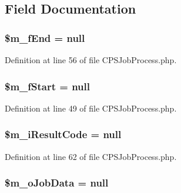 \subsection{Field Documentation}
\hypertarget{classCPSJobProcess_a98cd8e9f9042e529e7018d1c2ad9d15b}{
\subsubsection[{\$m\_\-fEnd}]{\setlength{\rightskip}{0pt plus 5cm}\$m\_\-fEnd = null}}
\label{classCPSJobProcess_a98cd8e9f9042e529e7018d1c2ad9d15b}


Definition at line 56 of file CPSJobProcess.php.

\hypertarget{classCPSJobProcess_a63a0fe0120a9bdc4e87f600d2964a2a6}{
\subsubsection[{\$m\_\-fStart}]{\setlength{\rightskip}{0pt plus 5cm}\$m\_\-fStart = null}}
\label{classCPSJobProcess_a63a0fe0120a9bdc4e87f600d2964a2a6}


Definition at line 49 of file CPSJobProcess.php.

\hypertarget{classCPSJobProcess_a8fbbd777ad79ed6d98d46d1c50d81f3d}{
\subsubsection[{\$m\_\-iResultCode}]{\setlength{\rightskip}{0pt plus 5cm}\$m\_\-iResultCode = null}}
\label{classCPSJobProcess_a8fbbd777ad79ed6d98d46d1c50d81f3d}


Definition at line 62 of file CPSJobProcess.php.

\hypertarget{classCPSJobProcess_aae15a90657d304e8bcbeffdc99db4fec}{
\subsubsection[{\$m\_\-oJobData}]{\setlength{\rightskip}{0pt plus 5cm}\$m\_\-oJobData = null}}
\label{classCPSJobProcess_aae15a90657d304e8bcbeffdc99db4fec}


